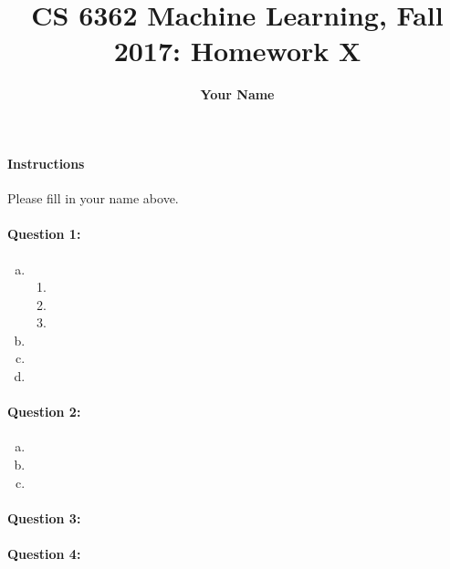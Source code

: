 \documentclass[letterpaper,11pt]{article}
\title{CS 6362 Machine Learning, Fall 2017: Homework X}
\date{}
\author{\bf Your Name}
\begin{document}
\maketitle

\paragraph*{Instructions} Please fill in your name above.

\paragraph{Question 1:}
\begin{enumerate}[(a)]
\item \begin{enumerate}[(1)]
\item
\item
\item
\end{enumerate}
\item
\item
\item
\end{enumerate}

\paragraph{Question 2:}
\begin{enumerate}[(a)]
\item
\item
\item
\end{enumerate}

\paragraph{Question 3:}

\paragraph{Question 4:}
\end{document}
